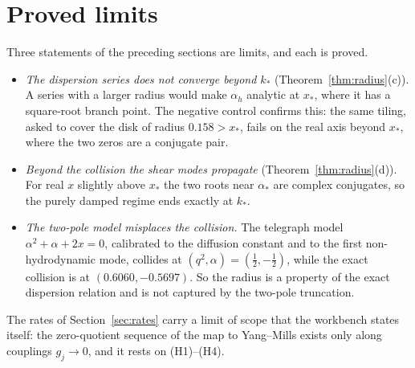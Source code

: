 \section{Proved limits}\label{sec:negative}

Three statements of the preceding sections are limits, and each is proved.
\begin{itemize}
\item \emph{The dispersion series does not converge beyond $k_*$} (Theorem~\ref{thm:radius}(c)). A series with a larger radius would make $\alpha_h$ analytic at $x_*$, where it has a square-root branch point. The negative control confirms this: the same tiling, asked to cover the disk of radius $0.158>x_*$, fails on the real axis beyond $x_*$, where the two zeros are a conjugate pair.
\item \emph{Beyond the collision the shear modes propagate} (Theorem~\ref{thm:radius}(d)). For real $x$ slightly above $x_*$ the two roots near $\alpha_*$ are complex conjugates, so the purely damped regime ends exactly at $k_*$.
\item \emph{The two-pole model misplaces the collision.} The telegraph model $\alpha^2+\alpha+2x=0$, calibrated to the diffusion constant and to the first non-hydrodynamic mode, collides at $(q^2,\alpha)=(\frac12,-\frac12)$, while the exact collision is at $(0.6060,-0.5697)$. So the radius is a property of the exact dispersion relation and is not captured by the two-pole truncation.
\end{itemize}
The rates of Section~\ref{sec:rates} carry a limit of scope that the workbench states itself: the zero-quotient sequence of the map to Yang--Mills exists only along couplings $g_j\to0$, and it rests on (H1)--(H4).

